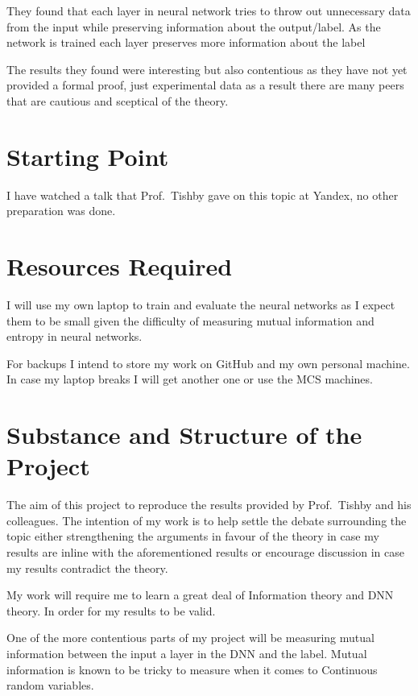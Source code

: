 \documentclass[12pt]{article}
\begin{document}
They found that each layer in neural network tries to throw out unnecessary data
from the input while preserving information about the output/label. As the
network is trained each layer preserves more information about the label

The results they found were interesting but also contentious as they have not
yet provided a formal proof, just experimental data as a result there are many
peers that are cautious and sceptical of the theory.

\section*{Starting Point}

I have watched a talk that Prof.\ Tishby gave on this topic at Yandex, no other
preparation was done. 

\section*{Resources Required}

I will use my own laptop to train and evaluate the neural networks as I expect
them to be small given the difficulty of measuring mutual information and
entropy in neural networks.

For backups I intend to store my work on GitHub and my own personal machine. In
case my laptop breaks I will get another one or use the MCS machines.

\section*{Substance and Structure of the Project}

The aim of this project to reproduce the results provided by Prof.\ Tishby and
his colleagues. The intention of my work is to help settle the debate surrounding the
topic either strengthening the arguments in favour of the theory in case my
results are inline with the aforementioned results or encourage discussion in
case my results contradict the theory.

My work will require me to learn a great deal of Information theory and DNN
theory. In order for my results to be valid.

One of the more contentious parts of my project will be measuring mutual
information between the input a layer in the DNN and the label. Mutual
information is known to be tricky to measure when it comes to Continuous random
variables.
\end{document}
